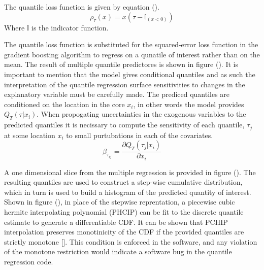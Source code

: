 The quantile loss function is given by equation ().
\begin{equation}
\rho_\tau(x) = x(\tau - \mathbb{I}_{(x < 0)})
\end{equation}
Where $\mathbb{I}$ is the indicator function.

The quantile loss function is substituted for the squared-error loss function in the gradient boosting algorithm to regress on a qunatile of interest rather than on the mean.  The result of multiple quantile predictores is shown in figure ().  It is important to mention that the model gives conditional quantiles and as such the interpretation of the quantile regression surface sensitivities to changes in the explanatory variable must be carefully made.  The prediced quantiles are conditioned on the location in the core $x_i$, in other words the model provides $Q_T(\tau|x_i)$.  When propogating uncertainties in the exogenous variables to the predicted quantiles it is necissary to compute the sensitivity of each quantile, $\tau_j$ at some location $x_i$ to small purtubations in each of the covariates.
\begin{equation}
\beta_{\tau_{ij}} = \frac{\partial Q_T(\tau_j|x_i)}{\partial x_i}
\end{equation}

A one dimensional slice from the multiple regression is provided in figure ().
The resulting quantiles are used to construct a step-wise cumulative distribution, which in turn is used to build a histogram of the predicted quantity of interest. \\

Shown in figure (), in place of the stepwise reprentation, a piecewise cubic hermite interpolating polynomial (PHCIP) can be fit to the discrete quantile estimate to generate a differentiable CDF.
It can be shown that PCHIP interpolation preserves monotinicity of the CDF if the provided quantiles are strictly monotone [].  This condition is enforced in the software, and any violation of the monotone restriction would indicate a software bug in the quantile regression code.
